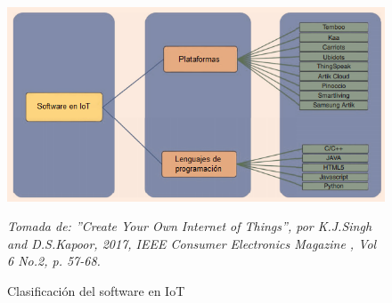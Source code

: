 \nocite{7925808}
\nocite{7842386}
\nocite{esp32}
\nocite{omega}
\nocite{raspberry}
\nocite{molano}
\nocite{Cha}
\nocite{thingspeak}
\nocite{initial}
\nocite{ubidots}


\begin{figure}[ht!]
\begin{centering}
\includegraphics [trim = 0mm 0mm 0mm 0mm, clip,angle=0,scale=0.55]{Images/software}%
\caption{\label{fig:Software}Clasificación del software en IoT} \textit{Tomada de: ''Create Your Own Internet of Things'', por K.J.Singh and D.S.Kapoor, 2017, IEEE Consumer Electronics Magazine , Vol 6 No.2, p. 57-68.}
\par\end{centering}
\end{figure}
